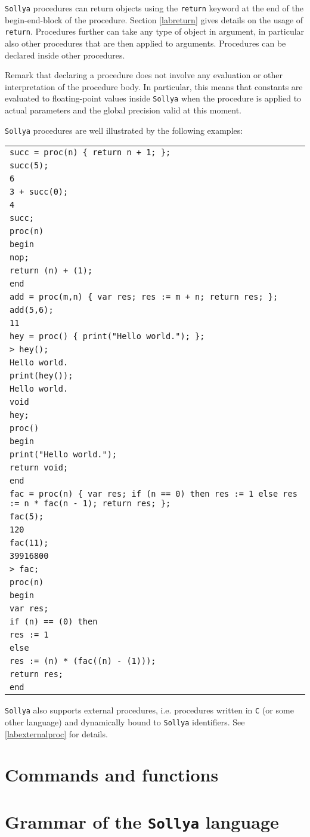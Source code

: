 \documentclass[a4paper]{article}
\newcommand{\key}[1]{\texttt{#1}}
\newcommand{\sollya}{\texttt{Sollya}\xspace}
\newcommand{\code}[1]{
\begin{center}
\begin{tabular}{|p{14.8cm}|}
\hline
#1
\hline
\end{tabular}
\end{center}
}
\newcommand{\ligne}[1]{\texttt{#1}\\}
\begin{document}
\sollya procedures can return objects using the \key{return} keyword
at the end of the begin-end-block of the procedure. Section
\ref{labreturn} gives details on the usage of \key{return}. Procedures
further can take any type of object in argument, in particular also
other procedures that are then applied to arguments. Procedures can
be declared inside other procedures. 

Remark that declaring a procedure does not involve any evaluation or
other interpretation of the procedure body. In particular, this means
that constants are evaluated to floating-point values inside \sollya
when the procedure is applied to actual parameters and the global
precision valid at this moment.

\sollya procedures are well illustrated by the following examples:

\code{
\ligne{succ = proc(n) \{ return n + 1; \};}
\ligne{succ(5);}
\ligne{6}
\ligne{3 + succ(0);}
\ligne{4}
\ligne{succ;}
\ligne{proc(n)}
\ligne{begin}
\ligne{nop;}
\ligne{return (n) + (1);}
\ligne{end}
\ligne{add = proc(m,n) \{ var res; res := m + n; return res; \};}
\ligne{add(5,6);}
\ligne{11}
\ligne{hey = proc() \{ print("Hello world."); \};}
\ligne{> hey();}
\ligne{Hello world.}
\ligne{print(hey());}
\ligne{Hello world.}
\ligne{void}
\ligne{hey;}
\ligne{proc()}
\ligne{begin}
\ligne{print("Hello world.");}
\ligne{return void;}
\ligne{end}
\ligne{fac = proc(n) \{ var res; if (n == 0) then res := 1 else res := n * fac(n - 1); return res; \};}
\ligne{fac(5);}
\ligne{120}
\ligne{fac(11);}
\ligne{39916800}
\ligne{> fac;}
\ligne{proc(n)}
\ligne{begin}
\ligne{var res;}
\ligne{if (n) == (0) then}
\ligne{res := 1}
\ligne{else}
\ligne{res := (n) * (fac((n) - (1)));}
\ligne{return res;}
\ligne{end}
} 

\sollya also supports external procedures, i.e. procedures written in
\texttt{C} (or some other language) and dynamically bound to \sollya
identifiers. See \ref{labexternalproc} for details.

\section{Commands and functions}



\section{Grammar of the \sollya language}\label{grammar}


\end{document}
